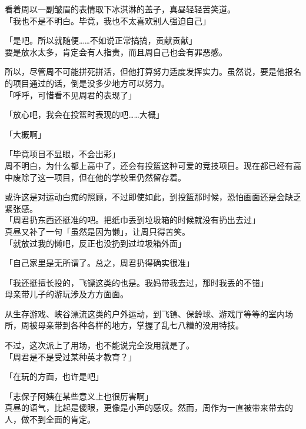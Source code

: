 看着周以一副皱眉的表情取下冰淇淋的盖子，真昼轻轻苦笑道。\\

「我也不是不明白。毕竟，我也不太喜欢别人强迫自己」

「是吧。所以就随便……不如说正常搞搞，贡献贡献」\\

要是放水太多，肯定会有人指责，而且周自己也会有罪恶感。

所以，尽管周不可能拼死拼活，但他打算努力适度发挥实力。虽然说，要是他报名的项目通过的话，倒是没多少地方可以努力。\\

「呼呼，可惜看不见周君的表现了」

「放心吧，我会在投篮时表现的吧……大概」

「大概啊」

「毕竟项目不显眼，不会出彩」\\

周不明白，为什么都上高中了，还会有投篮这种可爱的竞技项目。现在都已经有高中废除了这一项目，但在他的学校里仍然留存着。

或许这是对运动白痴的照顾，不过即使如此，到投篮那时候，恐怕画面还是会缺乏紧张感。\\

「周君扔东西还挺准的吧。把纸巾丢到垃圾箱的时候就没有扔出去过」\\

真昼又补了一句「虽然是因为懒」，让周只得苦笑。\\

「就放过我的懒吧，反正也没扔到过垃圾箱外面」

「自己家里是无所谓了。总之，周君扔得确实很准」

「我还挺擅长投的，飞镖这类的也是。我妈带我去过，那时我丢的不错」\\

母亲带儿子的游玩涉及方方面面。

从生存游戏、峡谷漂流这类的户外运动，到飞镖、保龄球、游戏厅等等的室内场所，周被母亲带到各种各样的地方，掌握了乱七八糟的没用特技。

不过，这次派上了用场，也不能说完全没用就是了。\\

「周君是不是受过某种英才教育？」

「在玩的方面，也许是吧」

「志保子阿姨在某些意义上也很厉害啊」\\

真昼的语气，比起是傻眼，更像是小声的感叹。然而，周作为一直被带来带去的人，做不到全面的肯定。\\

